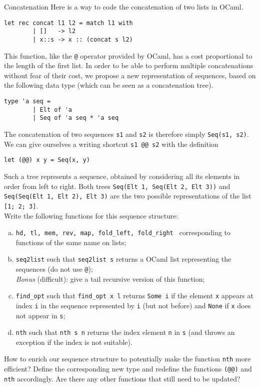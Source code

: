 \begin{problem}{Concatenation}{}
    Here is a way to code the concatenation of two lists in OCaml.
    \begin{lstlisting}[style=caml]
        let rec concat l1 l2 = match l1 with
        | []   -> l2
        | x::s -> x :: (concat s l2)
\end{lstlisting}
    This function, like the \lstinline|@| operator provided by OCaml, has a cost proportional to the length of the first list. 
    In order to be able to perform multiple concatenations without fear of their cost, 
    we propose a new representation of sequences, 
    based on the following data type (which can be seen as a concatenation tree).
    \begin{lstlisting}[style=caml]
        type 'a seq =
        | Elt of 'a
        | Seq of 'a seq * 'a seq
\end{lstlisting}
    The concatenation of two sequences \lstinline|s1| and \lstinline|s2| is therefore simply \lstinline|Seq(s1, s2)|. 
    We can give ourselves a writing shortcut \lstinline|s1 @@ s2| with the definition
    \begin{lstlisting}[style=caml]
        let (@@) x y = Seq(x, y)
\end{lstlisting}
    Such a tree represents a sequence, obtained by considering all its elements in order from left to
    right. 
    Both trees \lstinline|Seq(Elt 1, Seq(Elt 2, Elt 3))| and \lstinline|Seq(Seq(Elt 1, Elt 2), Elt 3)| are the two possible representations of the list \lstinline|[1; 2; 3]|.\\
    \vfil 
    Write the following functions for this sequence structure:
    \begin{enumerate}[(a)]
        \item \lstinline|hd, tl, mem, rev, map, fold_left, fold_right | corresponding to functions of the same name on lists;
        \item \lstinline|seq2list| such that \lstinline|seq2list s| returns a OCaml list representing the sequences (do not use \lstinline|@|);\\
        \emph{Bonus} (difficult): give a tail recursive version of this function;
        \item \lstinline|find_opt| such that \lstinline|find_opt x l| returns \lstinline|Some i| if the element \lstinline|x| appears at index \lstinline|i| in the sequence represented by \lstinline|i| (but not before) and \lstinline|None| if \lstinline|x| does not appear in \lstinline|s|;
        \item \lstinline|nth| such that \lstinline|nth s n| returns the index element \lstinline|n| in \lstinline|s| (and throws an exception if the index is not suitable).
    \end{enumerate}
    How to enrich our sequence structure to potentially make the function \lstinline|nth| more efficient?
    Define the corresponding new type and redefine the functions \lstinline|(@@)| and \lstinline|nth| accordingly. Are there any other functions that still need to be updated?
\end{problem}


